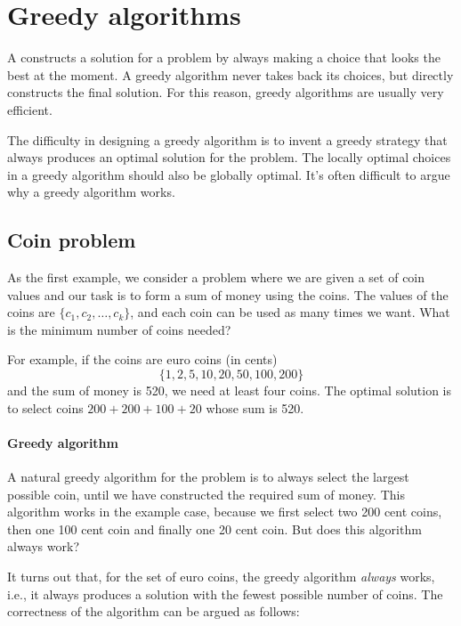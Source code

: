 \chapter{Greedy algorithms}


A 
constructs a solution for a problem
by always making a choice that looks
the best at the moment.
A greedy algorithm never takes back
its choices, but directly constructs
the final solution.
For this reason, greedy algorithms
are usually very efficient.

The difficulty in designing a greedy algorithm
is to invent a greedy strategy
that always produces an optimal solution
for the problem.
The locally optimal choices in a greedy
algorithm should also be globally optimal.
It's often difficult to argue why
a greedy algorithm works.

\section{Coin problem}

As the first example, we consider a problem
where we are given a set of coin values
and our task is to form a sum of money
using the coins.
The values of the coins are
$\{c_1,c_2,\ldots,c_k\}$,
and each coin can be used as many times we want.
What is the minimum number of coins needed?

For example, if the coins are euro coins (in cents)
\[\{1,2,5,10,20,50,100,200\}\]
and the sum of money is 520,
we need at least four coins.
The optimal solution is to select coins
$200+200+100+20$ whose sum is 520.

\subsubsection{Greedy algorithm}

A natural greedy algorithm for the problem
is to always select the largest possible coin,
until we have constructed the required sum of money.
This algorithm works in the example case,
because we first select two 200 cent coins,
then one 100 cent coin and finally one 20 cent coin.
But does this algorithm always work?

It turns out that, for the set of euro coins,
the greedy algorithm \emph{always} works, i.e.,
it always produces a solution with the fewest
possible number of coins.
The correctness of the algorithm can be
argued as follows:


